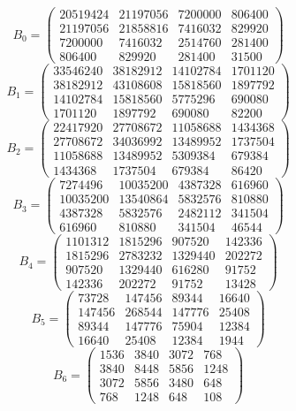 \begingroup
\small
\setlength{\arraycolsep}{5pt}
\[
B_0=\begin{pmatrix}
20519424 & 21197056 & 7200000 & 806400 \\
21197056 & 21858816 & 7416032 & 829920 \\
7200000 & 7416032 & 2514760 & 281400 \\
806400 & 829920 & 281400 & 31500
\end{pmatrix}
\]
\[
B_1=\begin{pmatrix}
33546240 & 38182912 & 14102784 & 1701120 \\
38182912 & 43108608 & 15818560 & 1897792 \\
14102784 & 15818560 & 5775296 & 690080 \\
1701120 & 1897792 & 690080 & 82200
\end{pmatrix}
\]
\[
B_2=\begin{pmatrix}
22417920 & 27708672 & 11058688 & 1434368 \\
27708672 & 34036992 & 13489952 & 1737504 \\
11058688 & 13489952 & 5309384 & 679384 \\
1434368 & 1737504 & 679384 & 86420
\end{pmatrix}
\]
\[
B_3=\begin{pmatrix}
7274496 & 10035200 & 4387328 & 616960 \\
10035200 & 13540864 & 5832576 & 810880 \\
4387328 & 5832576 & 2482112 & 341504 \\
616960 & 810880 & 341504 & 46544
\end{pmatrix}
\]
\[
B_4=\begin{pmatrix}
1101312 & 1815296 & 907520 & 142336 \\
1815296 & 2783232 & 1329440 & 202272 \\
907520 & 1329440 & 616280 & 91752 \\
142336 & 202272 & 91752 & 13428
\end{pmatrix}
\]
\[
B_5=\begin{pmatrix}
73728 & 147456 & 89344 & 16640 \\
147456 & 268544 & 147776 & 25408 \\
89344 & 147776 & 75904 & 12384 \\
16640 & 25408 & 12384 & 1944
\end{pmatrix}
\]
\[
B_6=\begin{pmatrix}
1536 & 3840 & 3072 & 768 \\
3840 & 8448 & 5856 & 1248 \\
3072 & 5856 & 3480 & 648 \\
768 & 1248 & 648 & 108
\end{pmatrix}
\]
\endgroup
